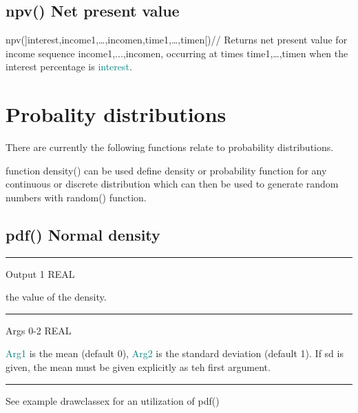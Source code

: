 \subsection{\textcolor{VioletRed}{npv}() Net present value}
\label{npv}

\textcolor{VioletRed}{npv}(]interest,income1,…,incomen,time1,…,timen[)//
Returns net present value for income sequence income1,...,incomen, occurring at times
time1,…,timen when the interest percentage is \textcolor{teal}{interest}.
\section{Probality distributions}
\label{dist}
There are currently the following functions relate to probability distributions.
\begin{note}
function \textcolor{VioletRed}{density}() can be used define density or probability
function for any continuous or discrete distribution which can then be used
to generate random numbers with \textcolor{VioletRed}{random}() function.
\end{note}
\subsection{\textcolor{VioletRed}{pdf}() Normal density}
\label{pdf}
\vspace{0.3cm}
\hrule
\vspace{0.3cm}
\noindent Output  \tabto{3cm}  1  \tabto{5cm}   REAL  \tabto{7cm}
\begin{changemargin}{3cm}{0cm}
\noindent  the value of the density.
\end{changemargin}
\vspace{0.3cm}
\hrule
\vspace{0.3cm}
\noindent Args  \tabto{3cm} 0-2  \tabto{5cm}   REAL  \tabto{7cm}
\begin{changemargin}{3cm}{0cm}
\noindent  \textcolor{teal}{Arg1} is the mean (default 0), \textcolor{teal}{Arg2} is the standard deviation
(default 1). If sd is given, the mean must be given explicitly as teh first argument.
\end {changemargin}
\hrule
\vspace{0.2cm}
\begin{note}
See example drawclassex for an utilization of \textcolor{VioletRed}{pdf}()
\end{note}

